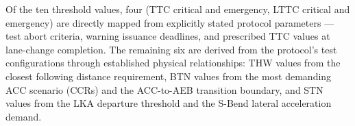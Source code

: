 
Of the ten threshold values, four (TTC critical and emergency, LTTC critical and emergency) are directly mapped from explicitly stated protocol parameters --- test abort criteria, warning issuance deadlines, and prescribed TTC values at lane-change completion. The remaining six are derived from the protocol's test configurations through established physical relationships: THW values from the closest following distance requirement, BTN values from the most demanding ACC scenario (CCRs) and the ACC-to-AEB transition boundary, and STN values from the LKA departure threshold and the S-Bend lateral acceleration demand.

